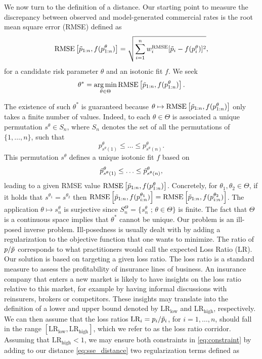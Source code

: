 \documentclass[10pt]{article}
\DeclareMathOperator*{\argmin}{arg\,min}
\begin{document}
We now turn to the definition of a distance. Our starting point to measure the discrepancy between observed and model-generated commercial rates is the root mean square error (RMSE) defined as
\begin{equation}\label{eq:sse_distance}
\text{RMSE}\left[\Tilde{p}_{1:n}, f(p^\theta_{1:n})\right] = \sqrt{\sum_{i=1}^nw^{\text{RMSE}}_i [\Tilde{p}_i - f(p_i^\theta)]^2},
\end{equation}
for a candidate risk parameter $\theta$ and an isotonic fit $f$. We seek 
$$
\theta^\ast = \underset{\theta\in \Theta}{\argmin}\,
\text{RMSE}\left[\Tilde{p}_{1:n}, f(p^\theta_{1:n})\right].
$$

The existence of such $\theta^\ast$ is guaranteed because $\theta\mapsto \text{RMSE}\left[\Tilde{p}_{1:n}, f(p^\theta_{1:n})\right]$ only takes a finite number of values. Indeed, to each $\theta \in \Theta$ is associated a unique permutation $s^\theta\in S_n$, where $S_n$ denotes the set of all the permutations of $\{1,\ldots, n\}$, such that 
$$
p^\theta_{s^\theta(1)}\leq\ldots\leq p^\theta_{s^\theta(n)}.
$$
This permutation $s^\theta$ defines a unique isotonic fit $f$ based on 
$$
\Tilde{p}^\theta_{s^\theta(1)}\leq\ldots\leq \Tilde{p}^\theta_{s^\theta(n)},
$$
leading to a given RMSE value $\text{RMSE}\left[\Tilde{p}_{1:n}, f(p^\theta_{1:n})\right]$. Concretely, for $\theta_1,\theta_2\in \Theta$, if it holds that $s^{\theta_1} = s^{\theta_2}$ then $\text{RMSE}\left[\Tilde{p}_{1:n}, f(p^{\theta_1}_{i:n})\right] = \text{RMSE}\left[\Tilde{p}_{1:n}, f(p^{\theta_2}_{i:n})\right]$. The application $\theta\mapsto s_n^\theta$ is surjective since $S_n^\Theta = \{s_n^\theta\text{ ; }\theta\in \Theta\}$  is finite.  The fact that $\Theta$ is a continuous space implies that $\theta^\ast$ cannot be unique. Our problem is an ill-posed inverse problem. Ill-posedness is usually dealt with by adding a regularization to the objective function that one wants to minimize. The ratio of \(p / \Tilde{p}\) corresponds to what practitioners would call the expected Loss Ratio (\(\text{LR}\)). Our solution is based on targeting a given loss ratio.  The loss ratio is a standard measure to assess the profitability of insurance lines of business. An insurance company that enters a new market is likely to have insights on the loss ratio relative to this market, for example by having informal discussions with reinsurers, brokers or competitors. These insights may translate into the definition of a lower and upper bound denoted by \(\text{LR}_{\text{low}}\) and \(\text{LR}_{\text{high}}\), respectively. We can then assume that the loss ratios \(\text{LR}_i = p_i / \Tilde{p}_i\), for \(i = 1, \ldots, n\), should fall in the range \([\text{LR}_{\text{low}}, \text{LR}_{\text{high}}]\), which we refer to as the loss ratio corridor. Assuming that \(\text{LR}_{\text{high}} < 1\), we may ensure both constraints in \eqref{eq:constraint} by adding to our distance \eqref{eq:sse_distance} two regularization terms defined as
\end{document}
